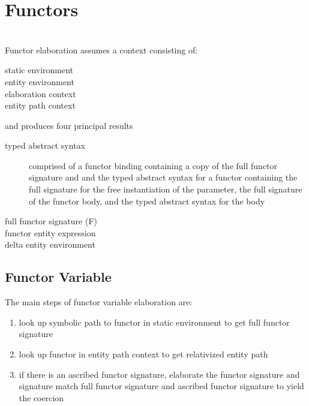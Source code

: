\section{Functors}
\\
Functor elaboration assumes a context consisting of:
\begin{description}
	\item[static environment]
	\item[entity environment]
	\item[elaboration context]
	\item[entity path context]
\end{description}

and produces four principal results
\begin{description}
	\item [typed abstract syntax] comprised of a functor binding containing a copy of the full functor signature and and the typed abstract syntax for a functor containing the full signature for the free instantiation of the parameter, the full signature of the functor body, and the typed abstract syntax for the body
	\item [full functor signature (F)]
	\item [functor entity expression]
	\item [delta entity environment]
\end{description}

\subsection{Functor Variable}
The main steps of functor variable elaboration are:
\begin{enumerate}
\item look up symbolic path to functor in static environment to get full functor signature
\item look up functor in entity path context to get relativized entity path
\item if there is an ascribed functor signature, elaborate the functor signature and signature match full functor signature and ascribed functor signature to yield the coercion
\end{enumerate}

